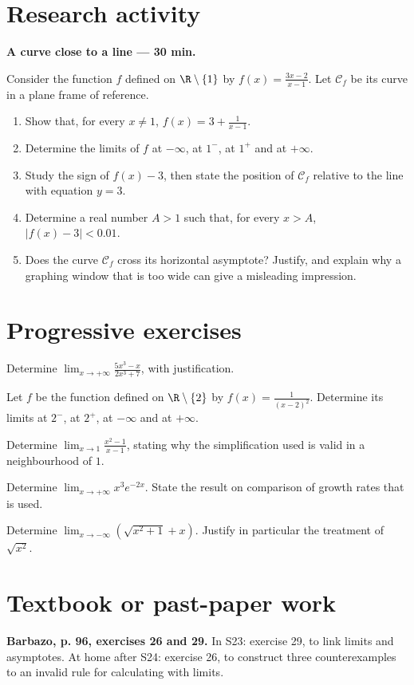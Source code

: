 \section{Research activity}\textbf{A curve close to a line --- 30 min.}\par Consider the function $f$ defined on $\R\setminus\{1\}$ by $f(x)=\frac{3x-2}{x-1}$. Let $\mathcal C_f$ be its curve in a plane frame of reference.
\begin{enumerate}\item Show that, for every $x\ne1$, $f(x)=3+\frac1{x-1}$.
\item Determine the limits of $f$ at $-\infty$, at $1^-$, at $1^+$ and at $+\infty$.
\item Study the sign of $f(x)-3$, then state the position of $\mathcal C_f$ relative to the line with equation $y=3$.
\item Determine a real number $A>1$ such that, for every $x>A$, $|f(x)-3|<0.01$.
\item Does the curve $\mathcal C_f$ cross its horizontal asymptote? Justify, and explain why a graphing window that is too wide can give a misleading impression.\end{enumerate}

\section{Progressive exercises}

Determine $\displaystyle\lim_{x\to+\infty}\frac{5x^3-x}{2x^3+7}$, with justification.

Let $f$ be the function defined on $\R\setminus\{2\}$ by $f(x)=\frac1{(x-2)^2}$. Determine its limits at $2^-$, at $2^+$, at $-\infty$ and at $+\infty$.

Determine $\displaystyle\lim_{x\to1}\frac{x^2-1}{x-1}$, stating why the simplification used is valid in a neighbourhood of $1$.

Determine $\displaystyle\lim_{x\to+\infty}x^3e^{-2x}$. State the result on comparison of growth rates that is used.

Determine $\displaystyle\lim_{x\to-\infty}\left(\sqrt{x^2+1}+x\right)$. Justify in particular the treatment of $\sqrt{x^2}$.

\section{Textbook or past-paper work}\textbf{Barbazo, p. 96, exercises 26 and 29.} In S23: exercise 29, to link limits and asymptotes. At home after S24: exercise 26, to construct three counterexamples to an invalid rule for calculating with limits.

